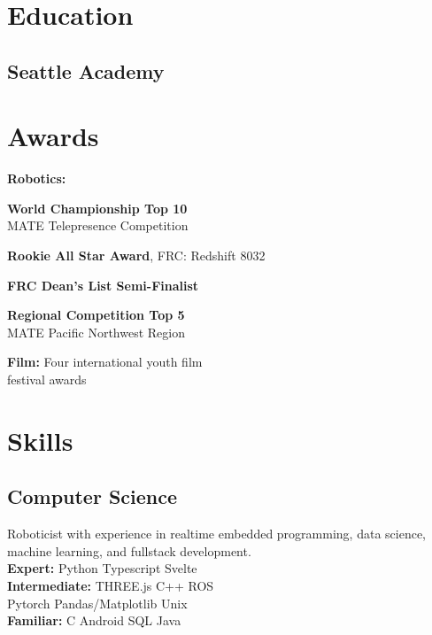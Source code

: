 \documentclass[]{deedy-resume-openfont}
\begin{document}
\begin{paracol}{2}


\section{Education} 

\subsection{Seattle Academy\hfill}
\sectionsep


\section{Awards} 
\textbf{Robotics:}
\begin{description}[style=multiline,nosep,leftmargin=1cm,font=\normalfont]
\item[2021] \textbf{World Championship Top 10} \\ MATE  Telepresence Competition
\item[2020] \textbf{Rookie All Star Award}, FRC: Redshift 8032
\item[2020] \textbf{FRC Dean's List Semi-Finalist}
\item[2018] \textbf{Regional Competition Top 5} \\ MATE Pacific Northwest Region 
\end{description}
\textbf{Film:} Four international youth film \\ festival awards

\sectionsep


\section{Skills}
\subsection{Computer Science\hfill}
Roboticist with experience
in realtime embedded programming, data science, machine learning, 
and fullstack development. \\
\textbf{Expert:} Python \textbullet{} Typescript  \textbullet{}
 Svelte \\
\textbf{Intermediate:} THREE.js \textbullet{} C++ \textbullet{} ROS \\ 
Pytorch \textbullet{} Pandas/Matplotlib \textbullet{} Unix \\
\textbf{Familiar:}
C \textbullet{} Android \textbullet{} SQL \textbullet{} Java
\sectionsep


\end{paracol}
\end{document}
